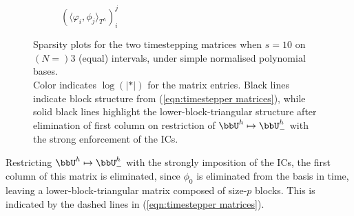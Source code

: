 \begin{example}
\begin{figure}[!ht]
\begin{subfigure}{0.5\textwidth}
                \caption{$(\langle\varphi_{i}, \phi_{j}\rangle_{T^{h}})^{j}_{i}$}
            \end{subfigure}
            \caption{Sparsity plots for the two timestepping matrices when $s  =  10$ on $(N  =)  3$ (equal) intervals, under simple normalised polynomial bases. \\ Color indicates $\log(|*|)$ for the matrix entries. Black lines indicate block structure from (\ref{eqn:timestepper matrices}), while solid black lines highlight the lower-block-triangular structure after elimination of first column on restriction of $\bbU^{h}  \mapsto  \bbU^{h}_{-}$ with the strong enforcement of the ICs.}
            \label{fig:timestepper matrices}
        \end{figure}
        
        Restricting $\bbU^{h}  \mapsto  \bbU^{h}_{-}$ with the strongly imposition of the ICs, the first column of this matrix is eliminated, since $\phi_{0}$ is eliminated from the basis in time, leaving a lower-block-triangular matrix composed of size-$p$ blocks. This is indicated by the dashed lines in (\ref{eqn:timestepper matrices}). 
        

\end{example}
